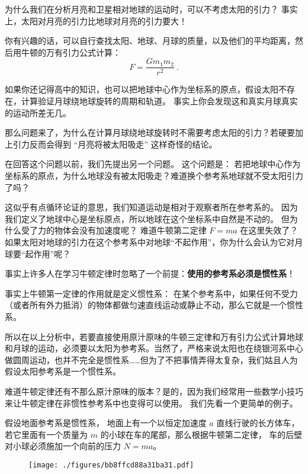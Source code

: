 

为什么我们在分析月亮和卫星相对地球的运动时，可以不考虑太阳的引力？ 事实上，太阳对月亮的引力比地球对月亮的引力要大！

你有兴趣的话，可以自行查找太阳、地球、月球的质量，以及他们的平均距离，然后用牛顿的万有引力公式计算：
\begin{equation}
F = \frac{Gm_1m_2}{r^2}~.
\end{equation}

如果你还记得高中的知识，也可以把地球中心作为坐标系的原点，假设太阳不存在，计算验证月球绕地球旋转的周期和轨道。 事实上你会发现这和真实月球真实的运动所差无几。

那么问题来了，为什么在计算月球绕地球旋转时不需要考虑太阳的引力？若硬要加上引力反而会得到 “月亮将被太阳吸走” 这样奇怪的结论。

在回答这个问题以前，我们先提出另一个问题。 这个问题是： 若把地球中心作为坐标系的原点，为什么地球没有被太阳吸走？难道换个参考系地球就不受太阳引力了吗？

这似乎有点循环论证的意思，我们知道运动是相对于观察者所在参考系的。 因为我们定义了地球中心是坐标原点，所以地球在这个坐标系中自然是不动的。 但为什么受了力的物体会没有加速度呢？ 难道牛顿第二定律 $F = ma$ 在这里失效了？ 如果太阳对地球的引力在这个参考系中对地球“不起作用”，你为什么会认为它对月球要“起作用”呢？

事实上许多人在学习牛顿定律时忽略了一个前提：\textbf{使用的参考系必须是惯性系}！

事实上牛顿第一定律的作用就是定义惯性系： 在某个参考系中，如果任何不受力（或者所有外力抵消）的物体都做匀速直线运动或静止不动，那么它就是一个惯性系。

所以在以上分析中，若要直接使用原汁原味的牛顿三定律和万有引力公式计算地球和月球的运动，必须要以太阳为参考系。当然了，严格来说太阳也在绕银河系中心做圆周运动，也并不完全是惯性系……但为了不把事情弄得太复杂，我们姑且人为假设太阳参考系是一个惯性系。

难道牛顿定律还有不那么原汁原味的版本？是的，因为我们经常用一些数学小技巧来让牛顿定律在非惯性参考系中也变得可以使用。 我们先看一个更简单的例子。

假设地面参考系是惯性系， 地面上有一个以恒定加速度 $a$ 直线行驶的长方体车， 若它里面有一个质量为 $m$ 的小球在车的尾部，那么根据牛顿第二定律， 车的后壁对小球必须施加一个向前的压力 $N = ma$。

\begin{figure}[ht]
\centering
\texttt{[image: ./figures/bb8ffcd88a31ba31.pdf]}
\caption{} \label{fig_EquivI_1}
\end{figure}

